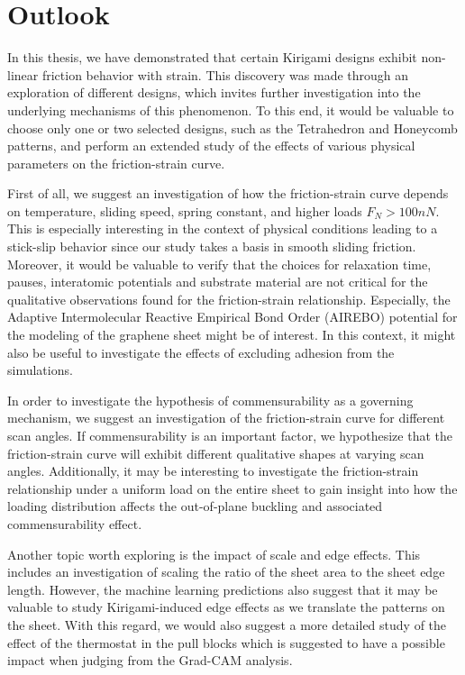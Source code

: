 \section{Outlook}
In this thesis, we have demonstrated that certain Kirigami designs exhibit non-linear friction behavior with strain. This discovery was made through an exploration of different designs, which invites further investigation into the underlying mechanisms of this phenomenon. To this end, it would be valuable to choose only one or two selected designs, such as the Tetrahedron and Honeycomb patterns, and perform an extended study of the effects of various physical parameters on the friction-strain curve.

First of all, we suggest an investigation of how the friction-strain curve
depends on temperature, sliding speed, spring constant, and higher loads $F_N > 100 nN$. This is especially interesting in the context of
physical conditions leading to a stick-slip behavior since our study takes a
basis in smooth sliding friction. Moreover, it would be valuable to verify that
the choices for relaxation time, pauses, interatomic potentials and substrate
material are not critical for the qualitative observations found for the
friction-strain relationship. Especially, the Adaptive Intermolecular Reactive
Empirical Bond Order (AIREBO) potential for the modeling of the graphene sheet
might be of interest. In this context, it might also be useful to investigate
the effects of excluding adhesion from the simulations. 

In order to investigate the hypothesis of commensurability as a governing
mechanism, we suggest an investigation of the friction-strain curve for different
scan angles. If commensurability is an important factor, we hypothesize that the friction-strain curve will exhibit different qualitative shapes at varying scan
angles. Additionally, it may be interesting to investigate the friction-strain
relationship under a uniform load on the entire sheet to gain insight into how the loading
distribution affects the out-of-plane buckling and associated commensurability
effect.

Another topic worth exploring is the impact of scale and edge effects. This includes an investigation of scaling the ratio of the sheet area to the sheet edge length. However, the machine learning predictions also suggest that it may be valuable to study Kirigami-induced edge effects as we translate the patterns on the sheet. With this regard, we would also suggest a more detailed study of the effect of the thermostat in the pull blocks which is suggested to have a possible impact when judging from the Grad-CAM analysis. 

